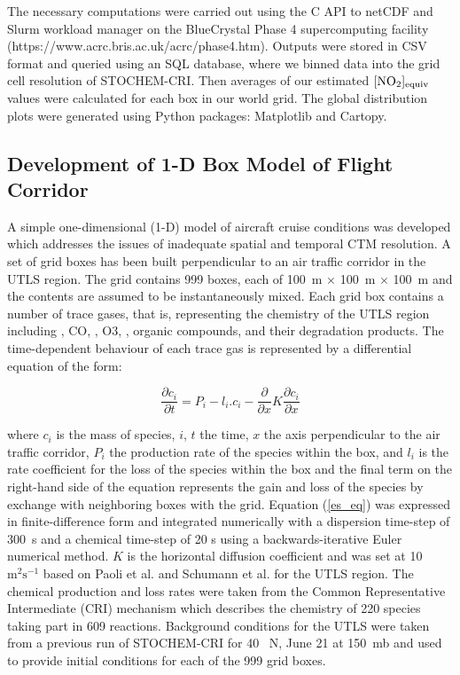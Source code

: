 The necessary computations were carried out using the C API to netCDF and Slurm workload manager on the BlueCrystal Phase 4 supercomputing facility (https://www.acrc.bris.ac.uk/acrc/phase4.htm). Outputs were stored in CSV format and queried using an SQL database, where we binned data into the grid cell resolution of STOCHEM-CRI. Then averages of our estimated ${[\ce{NO2}]_{\mathrm{equiv}}}$ values were calculated for each box in our world grid. The global distribution plots were generated using Python packages: Matplotlib and Cartopy.

\subsection{Development of 1-D Box Model of Flight Corridor}
A simple one-dimensional (1-D) model of aircraft cruise conditions was developed which addresses the issues of inadequate spatial and temporal CTM resolution. A set of grid boxes has been built perpendicular to an air traffic corridor in the UTLS region. The grid contains 999 boxes, each of 100~m × 100~m $\times$ 100~m and the contents are assumed to be instantaneously mixed. Each grid box contains a number of trace gases, that is, representing the chemistry of the UTLS region including , CO, , O3, , organic compounds, and their degradation products. The time-dependent behaviour of each trace gas is represented by a differential equation of the form:

\begin{equation}
	\frac{\partial c_i}{\partial t} = P_i - l_i . c_i - \frac{\partial}{\partial x} K \frac{\partial c_i}{\partial x}
\label{es_eq}
\end{equation}

where $c_i$ is the mass of species, $i$, $t$ the time, $x$ the axis perpendicular to the air traffic corridor, $P_i$ the production rate of the species within the box, and $l_i$ is the rate coefficient for the loss of the species within the box and the final term on the right-hand side of the equation represents the gain and loss of the species by exchange with neighboring boxes with the grid. Equation (\ref{es_eq}) was expressed in finite-difference form and integrated numerically with a dispersion time-step of 300~s and a chemical time-step of 20 s using a backwards-iterative Euler numerical method. $K$ is the horizontal diffusion coefficient and was set at 10 $\mathrm{m}^2 \mathrm{s}^{-1}$ based on Paoli et al. \cite{Paoli2011} and Schumann et al. \cite{Schumann1995} for the UTLS region. The chemical production and loss rates were taken from the Common Representative Intermediate (CRI) mechanism \cite{Jenkin2008, Watson2008, Utembe2009} which describes the chemistry of 220 species taking part in 609 reactions. Background conditions for the UTLS were taken from a previous run of STOCHEM-CRI for 40 \textdegree~N, June 21 at 150~mb and used to provide initial conditions for each of the 999 grid boxes.